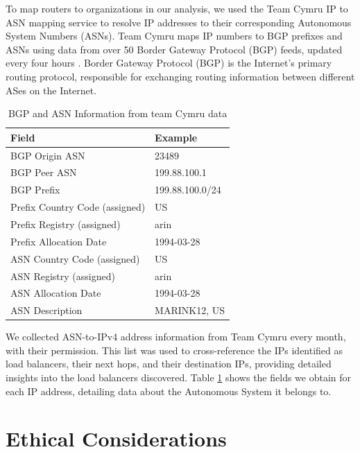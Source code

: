 \documentclass[12pt]{cwru_thesis}
\begin{document}
To map routers to organizations in our analysis, we used the Team Cymru IP to ASN mapping service to resolve IP addresses to their corresponding Autonomous System Numbers (ASNs). Team Cymru maps IP numbers to BGP prefixes and ASNs using data from over 50 Border Gateway Protocol (BGP) feeds, updated every four hours \cite{teamcymru2023ipasn}. Border Gateway Protocol (BGP) is the Internet's primary routing protocol, responsible for exchanging routing information between different ASes on the Internet.

\begin{table}[h]
    \centering
    \begin{tabularx}{0.6\textwidth}{|l|X|}
        \hline
        \textbf{Field} & \textbf{Example} \\
        \hline
        BGP Origin ASN & 23489 \\
        \hline
        BGP Peer ASN & 199.88.100.1 \\
        \hline
        BGP Prefix & 199.88.100.0/24 \\
        \hline
        Prefix Country Code (assigned) & US \\
        \hline
        Prefix Registry (assigned) & arin \\
        \hline
        Prefix Allocation Date & 1994-03-28 \\
        \hline
        ASN Country Code (assigned) & US \\
        \hline
        ASN Registry (assigned) & arin \\
        \hline
        ASN Allocation Date & 1994-03-28 \\
        \hline
        ASN Description & MARINK12, US \\
        \hline
    \end{tabularx}
    \caption{BGP and ASN Information from team Cymru data}
    \label{tab:bgp_asn_info}
\end{table}
 
 We collected ASN-to-IPv4 address information from Team Cymru every month, with their permission. This list was used to cross-reference the IPs identified as load balancers, their next hops, and their destination IPs, providing detailed insights into the load balancers discovered. Table \ref{tab:bgp_asn_info} shows the fields we obtain for each IP address, detailing data about  the Autonomous System it belongs to. 



\section{Ethical Considerations}
\end{document}
